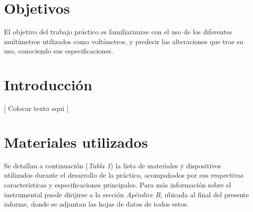 \documentclass{article}
\begin{document}
\section{Objetivos}

	El objetivo del trabajo práctico es familiarizarse con el uso de los diferentes multímetros utilizados como voltímetros, y predecir las alteraciones que trae su uso, conociendo sus especificaciones.
\bigskip



\section{Introducción}

	[ Colocar texto aquí ]
\bigskip




\section{Materiales utilizados}

	Se detallan a continuación (\textit{Tabla 1}) la lista de materiales y dispositivos utilizados durante el desarrollo de la práctica, acompañados por sus respectivas características y especificaciones principales. Para más información sobre el instrumental puede dirijirse a la sección \textit{Apéndice B}, ubicada al final del presente informe, donde se adjuntan las hojas de datos de todos estos.
\bigskip\bigskip
\end{document}
